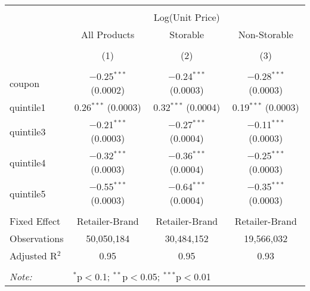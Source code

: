 
\begin{table}[!htbp] \centering 
  \caption{} 
  \label{tab:overallSavings} 
\begin{tabular}{@{\extracolsep{5pt}}lccc} 
\\[-1.8ex]\hline 
\hline \\[-1.8ex] 
 & \multicolumn{3}{c}{Log(Unit Price)} \\ 
\cline{2-4} 
 & All Products & Storable & Non-Storable \\ 
\\[-1.8ex] & (1) & (2) & (3)\\ 
\hline \\[-1.8ex] 
 coupon & $-$0.25$^{***}$ (0.0002) & $-$0.24$^{***}$ (0.0003) & $-$0.28$^{***}$ (0.0003) \\ 
  quintile1 & 0.26$^{***}$ (0.0003) & 0.32$^{***}$ (0.0004) & 0.19$^{***}$ (0.0003) \\ 
  quintile3 & $-$0.21$^{***}$ (0.0003) & $-$0.27$^{***}$ (0.0004) & $-$0.11$^{***}$ (0.0003) \\ 
  quintile4 & $-$0.32$^{***}$ (0.0003) & $-$0.36$^{***}$ (0.0004) & $-$0.25$^{***}$ (0.0003) \\ 
  quintile5 & $-$0.55$^{***}$ (0.0003) & $-$0.64$^{***}$ (0.0004) & $-$0.35$^{***}$ (0.0003) \\ 
 \hline \\[-1.8ex] 
Fixed Effect & Retailer-Brand & Retailer-Brand & Retailer-Brand \\ 
Observations & 50,050,184 & 30,484,152 & 19,566,032 \\ 
Adjusted R$^{2}$ & 0.95 & 0.95 & 0.93 \\ 
\hline 
\hline \\[-1.8ex] 
\textit{Note:}  & \multicolumn{3}{l}{$^{*}$p$<$0.1; $^{**}$p$<$0.05; $^{***}$p$<$0.01} \\ 
\end{tabular} 
\end{table} 
